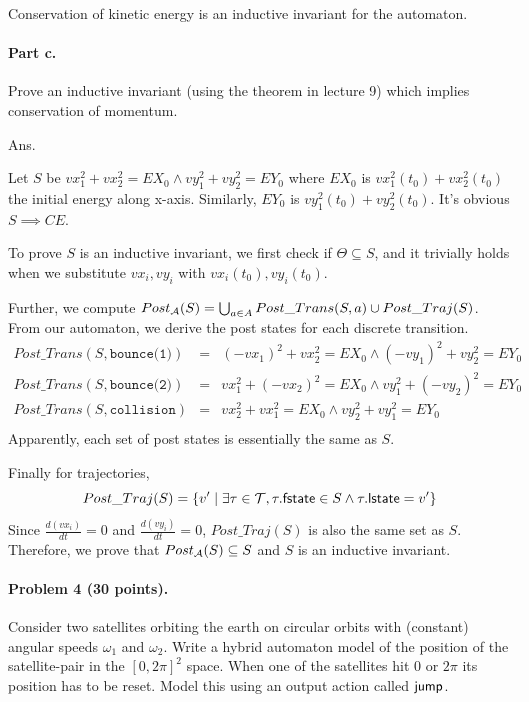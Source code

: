 \documentclass[11pt]{article}
\begin{document}
Conservation of kinetic energy is an inductive invariant for the automaton.

\paragraph{Part c.} Prove an inductive invariant (using the theorem in lecture 9) which implies conservation of momentum.

Ans.

Let $S$ be $vx_1^2 + vx_2^2 = EX_0 \land vy_1^2 + vy_2^2 = EY_0$
where $EX_0$ is ${vx_1^2(t_0) + vx_2^2(t_0)}$ the initial energy along x-axis.
Similarly, $EY_0$ is ${vy_1^2(t_0) + vy_2^2(t_0)}$.
It's obvious $S \implies CE$.

To prove $S$ is an inductive invariant, we first check if $\Theta \subseteq S$,
and it trivially holds when we substitute $vx_i, vy_i$ with $vx_i(t_0), vy_i(t_0)$.

Further, we compute $Post_{\cal A}(S) = \bigcup_{a\in A} Post\_Trans(S, a) \cup Post\_Traj(S)$.
From our automaton, we derive the post states for each discrete transition.
\[
\begin{array}{rcl}
Post\_Trans(S, \texttt{bounce(1)})&=& (-vx_1)^2 + vx_2^2 = EX_0 \land (-vy_1)^2 + vy_2^2 = EY_0\\
Post\_Trans(S, \texttt{bounce(2)})&=& vx_1^2 + (-vx_2)^2 = EX_0 \land vy_1^2 + (-vy_2)^2 = EY_0\\
Post\_Trans(S, \texttt{collision})&=& vx_2^2 + vx_1^2 = EX_0 \land vy_2^2 + vy_1^2 = EY_0\\
\end{array}
\]
Apparently, each set of post states is essentially the same as $S$.

Finally for trajectories,
\[
Post\_Traj(S) = \{ v' \mid \exists \tau \in {\cal T}, \tau.{\sf fstate} \in S \land \tau.{\sf lstate} = v'\}
\]
Since $\frac{d(vx_i)}{dt} =0$ and $\frac{d(vy_i)}{dt} = 0$, $Post\_Traj(S)$ is also the same set as $S$.
Therefore, we prove that $Post_{\cal A}(S) \subseteq S$ and $S$ is an inductive invariant.

\newpage

\paragraph{Problem 4 (30 points).}
Consider two satellites orbiting the earth on circular orbits with (constant) angular speeds $\omega_1$ and $\omega_2$. 
Write a hybrid automaton model of the position of the satellite-pair in the $[0,2\pi]^2$ space. When one of the satellites hit $0$ or $2\pi$ its position has to be reset. Model this using an output action called ${\operatorname{\mathsf{jump}}}$.
\end{document}
